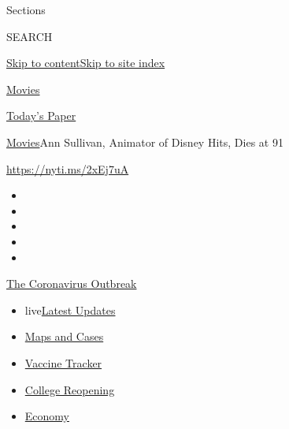 Sections

SEARCH

\protect\hyperlink{site-content}{Skip to
content}\protect\hyperlink{site-index}{Skip to site index}

\href{https://www.nytimes.com/section/movies}{Movies}

\href{https://myaccount.nytimes.com/auth/login?response_type=cookie\&client_id=vi}{}

\href{https://www.nytimes.com/section/todayspaper}{Today's Paper}

\href{/section/movies}{Movies}\textbar{}Ann Sullivan, Animator of Disney
Hits, Dies at 91

\url{https://nyti.ms/2xEj7uA}

\begin{itemize}
\item
\item
\item
\item
\item
\end{itemize}

\href{https://www.nytimes.com/news-event/coronavirus?action=click\&pgtype=Article\&state=default\&region=TOP_BANNER\&context=storylines_menu}{The
Coronavirus Outbreak}

\begin{itemize}
\tightlist
\item
  live\href{https://www.nytimes.com/2020/08/03/world/coronavirus-covid-19.html?action=click\&pgtype=Article\&state=default\&region=TOP_BANNER\&context=storylines_menu}{Latest
  Updates}
\item
  \href{https://www.nytimes.com/interactive/2020/us/coronavirus-us-cases.html?action=click\&pgtype=Article\&state=default\&region=TOP_BANNER\&context=storylines_menu}{Maps
  and Cases}
\item
  \href{https://www.nytimes.com/interactive/2020/science/coronavirus-vaccine-tracker.html?action=click\&pgtype=Article\&state=default\&region=TOP_BANNER\&context=storylines_menu}{Vaccine
  Tracker}
\item
  \href{https://www.nytimes.com/2020/08/02/us/covid-college-reopening.html?action=click\&pgtype=Article\&state=default\&region=TOP_BANNER\&context=storylines_menu}{College
  Reopening}
\item
  \href{https://www.nytimes.com/live/2020/08/03/business/stock-market-today-coronavirus?action=click\&pgtype=Article\&state=default\&region=TOP_BANNER\&context=storylines_menu}{Economy}
\end{itemize}

